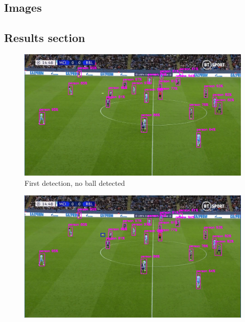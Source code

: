 \documentclass[
    11pt,
    twoside
]{report}
\begin{document}
\printbibliography





\appendix
\renewcommand{\thesection}{\Alph{section}.\arabic{section}}
\setcounter{section}{0}
\begin{appendices}


\section{Images}
\listoffigures

\subsection{Results section}

\begin{figure}[H]
    \includegraphics[keepaspectratio, width=\columnwidth]{first.png}
    \caption{First detection, no ball detected}
    \label{img:1}
\end{figure}
\begin{figure}[H]
    \includegraphics[keepaspectratio, width=\columnwidth]{Screenshot_2022-03-03_21-32-51.png}

\end{figure}
\end{appendices}
\end{document}
